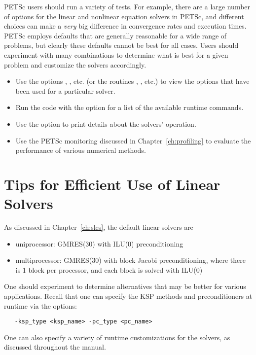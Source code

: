 PETSc users should run a variety of tests.  For example, there are a large number of options 
for the linear and nonlinear equation solvers in PETSc, and different 
choices can make a {\em very} big difference in convergence rates and execution 
times.  PETSc employs defaults that are generally reasonable for a wide
range of problems, but clearly these defaults cannot be best for all
cases.  Users should experiment with many combinations to determine 
what is best for a given problem and customize the solvers accordingly.
\begin{itemize}
\item Use the options , , etc. (or the routines 
     , , etc.) to view the options that have been
     used for a particular solver.
\item Run the code with the option  for a list of the available 
     runtime commands.
\item Use the option  to print details about the solvers' operation.
\item Use the PETSc monitoring discussed in Chapter~\ref{ch:profiling}
     to evaluate the performance of various numerical methods.
\end{itemize}

\section{Tips for Efficient Use of Linear Solvers}
\label{sec:slestips}

As discussed in Chapter~\ref{ch:sles}, the default linear solvers are
\begin{itemize}
\item uniprocessor: GMRES(30) with ILU(0) preconditioning\\
\item multiprocessor: GMRES(30) with block Jacobi preconditioning, where there
                     is 1 block per processor, and each block is solved with ILU(0)\\
\end{itemize}
One should experiment to determine alternatives that may be better for
various applications.  Recall that one can specify the KSP methods and
preconditioners at runtime via the options:
\begin{verbatim}
   -ksp_type <ksp_name> -pc_type <pc_name>
\end{verbatim}
One can also specify a variety of runtime customizations for the
solvers, as discussed throughout the manual.


